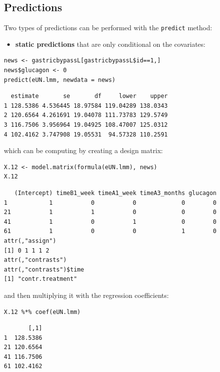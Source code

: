 \documentclass[12pt]{article}
\begin{document}
\subsection{Predictions}
\label{sec:orgf2bfb4d}

Two types of predictions can be performed with the \texttt{predict} method:
\begin{itemize}
\item \textbf{static predictions} that are only conditional on the covariates:
\end{itemize}
\lstset{language=r,label= ,caption= ,captionpos=b,numbers=none}
\begin{lstlisting}
news <- gastricbypassL[gastricbypassL$id==1,]
news$glucagon <- 0
predict(eUN.lmm, newdata = news)
\end{lstlisting}

\begin{verbatim}
  estimate       se       df     lower    upper
1 128.5386 4.536445 18.97584 119.04289 138.0343
2 120.6564 4.261691 19.04078 111.73783 129.5749
3 116.7506 3.956964 19.04925 108.47007 125.0312
4 102.4162 3.747908 19.05531  94.57328 110.2591
\end{verbatim}


which can be computing by creating a design matrix:
\lstset{language=r,label= ,caption= ,captionpos=b,numbers=none}
\begin{lstlisting}
X.12 <- model.matrix(formula(eUN.lmm), news)
X.12
\end{lstlisting}

\begin{verbatim}
   (Intercept) timeB1_week timeA1_week timeA3_months glucagon
1            1           0           0             0        0
21           1           1           0             0        0
41           1           0           1             0        0
61           1           0           0             1        0
attr(,"assign")
[1] 0 1 1 1 2
attr(,"contrasts")
attr(,"contrasts")$time
[1] "contr.treatment"
\end{verbatim}

and then multiplying it with the regression coefficients:
\lstset{language=r,label= ,caption= ,captionpos=b,numbers=none}
\begin{lstlisting}
X.12 %*% coef(eUN.lmm)
\end{lstlisting}

\begin{verbatim}
       [,1]
1  128.5386
21 120.6564
41 116.7506
61 102.4162
\end{verbatim}
\end{document}
